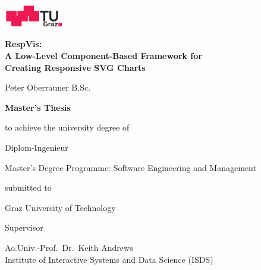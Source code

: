 \begin{center}
    \includegraphics[height=1cm]{diagrams/tugraz-logo.pdf}

    \vspace{2cm}

    \begin{spacing}{1.1}
        \huge\sffamily\bfseries
        RespVis:\\
        A Low-Level Component-Based Framework for\\
        Creating Responsive SVG Charts
    \end{spacing}

    \vspace{2cm}

    {\Large\sffamily Peter Oberrauner B.Sc.}

    \vspace{2cm}

    {\Large\sffamily\bfseries Master's Thesis}

    \vspace{5mm}

    {\small\sffamily to achieve the university degree of}

    \vspace{5mm}

    {\normalsize\sffamily Diplom-Ingenieur}  %

    \vspace{5mm}

    {\normalsize\sffamily
        Master's Degree Programme: Software Engineering and Management
    }


    \vspace{1cm}

    {\small\sffamily submitted to}

    \vspace{5mm}

    {\large\sffamily Graz University of Technology}



    \vspace{1cm}

    {\small\sffamily Supervisor}

    \vspace{5mm}

    {\normalsize\sffamily
        Ao.Univ.-Prof.\ Dr.\ Keith Andrews \\
        Institute of Interactive Systems and Data Science (ISDS)
    }



\end{center}
